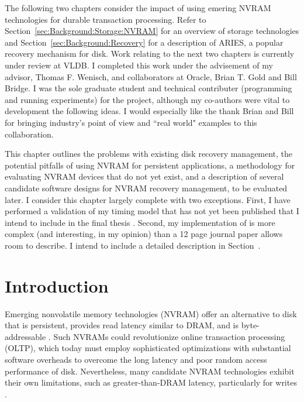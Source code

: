 The following two chapters consider the impact of using emering NVRAM technologies for durable transaction processing.
Refer to Section~\ref{sec:Background:Storage:NVRAM} for an overview of storage technologies and Section~\ref{sec:Background:Recovery} for a description of ARIES, a popular recovery mechanism for disk.
Work relating to the next two chapters is currently under review at VLDB.
I completed this work under the advisement of my advisor, Thomas F. Wenisch, and collaborators at Oracle, Brian T. Gold and Bill Bridge.
I was the sole graduate student and technical contributer (programming and running experiments) for the project, although my co-authors were vital to development the following ideas.
I would especially like the thank Brian and Bill for bringing industry's point of view and ``real world" examples to this collaboration.

This chapter outlines the problems with existing disk recovery management, the potential pitfalls of using NVRAM for persistent applications, a methodology for evaluating NVRAM devices that do not yet exist, and a description of several candidate software designs for NVRAM recovery management, to be evaluated later.
I consider this chapter largely complete with two exceptions.
First, I have performed a validation of my timing model that has not yet been published that I intend to include in the final thesis \cite{sec:OLTP_design:Methodology:Proposed}.
Second, my implementation of \GroupCommit is more complex (and interesting, in my opinion) than a 12 page journal paper allows room to describe.
I intend to include a detailed description in Section~\cite{sec::OLTP_design:GroupCommit:Proposed}.

\section{Introduction}
\label{sec:OLTP_design:Intro}

Emerging nonvolatile memory technologies (NVRAM) offer an alternative to disk that is persistent, provides read latency similar to DRAM, and is byte-addressable \cite{BurrKurdi08}.
Such NVRAMs could revolutionize online transaction processing (OLTP), which today must employ sophisticated optimizations with substantial software overheads to overcome the long latency and poor random access performance of disk.
Nevertheless, many candidate NVRAM technologies exhibit their own limitations, such as greater-than-DRAM latency, particularly for writes \cite{LeeIpek09}.

